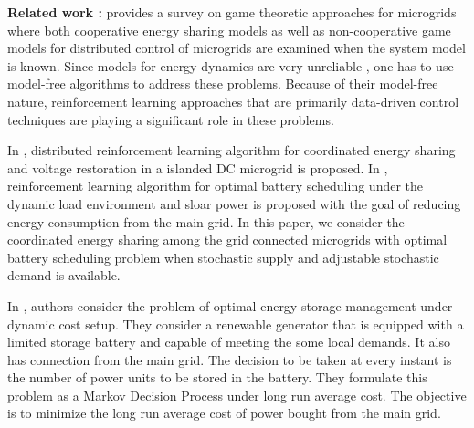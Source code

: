 \textbf{Related work :} \cite{saad2012game} provides a survey on game theoretic approaches for microgrids where both cooperative energy sharing models as well as non-cooperative game models for distributed control of microgrids are examined when the system model is known. Since  models for energy dynamics are very unreliable \cite{zamora2010controls}, one has to use model-free algorithms to address these problems.  Because of their model-free nature, reinforcement learning \cite{sutton1998reinforcement} approaches that are primarily data-driven control techniques are playing a significant role in these problems.

In \cite{zifadistributed}, distributed reinforcement learning algorithm for coordinated energy sharing and voltage restoration in a islanded DC microgrid is proposed. In \cite{leo2014reinforcement}, reinforcement learning algorithm for optimal battery scheduling under the dynamic load environment and sloar power is proposed with the goal of  reducing  energy consumption from the main grid. In this paper, we  consider the coordinated energy sharing among the grid connected microgrids with optimal battery scheduling problem when stochastic supply and adjustable stochastic demand is available.

In \cite{pharsha}, authors consider the problem of optimal energy storage management under dynamic cost setup. They consider a renewable generator that is equipped with a limited storage battery and capable of meeting the some local demands. It also has connection from the main grid. The decision to be taken at every instant is the number of power units to be stored in the battery. They formulate this problem as a Markov Decision Process under long run average cost. The objective is to minimize the long run average cost of power bought from the main grid.




%

